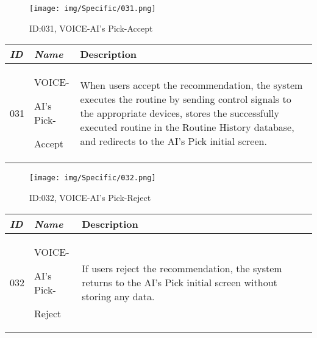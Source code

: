 \documentclass[conference]{IEEEtran}
\begin{document}
\begin{enumerate}[label=\arabic*]
    \begin{figure}[h]
        \centering
        \texttt{[image: img/Specific/031.png]}
        \caption{ID:031, VOICE-AI's Pick-Accept}
    \end{figure}

    \begin{table}[h]
    \def\arraystretch{1.2} \small
        \begin{tabular}{|p{1cm}|p{1.8cm}|p{4.8cm}|}
        \hline
            \textit{\textbf{ID}} & \textit{\textbf{Name}} & {\textbf{Description}} \\
        \hline
            031 \par & VOICE-\par AI's Pick-\par Accept & When users accept the recommendation, the system executes the routine by sending control signals to the appropriate devices, stores the successfully executed routine in the Routine History database, and redirects to the AI's Pick initial screen. \\
        \hline
        \end{tabular}
    \end{table}

    \newpage

    \begin{figure}[h]
        \centering
        \texttt{[image: img/Specific/032.png]}
        \caption{ID:032, VOICE-AI's Pick-Reject}
    \end{figure}

    \begin{table}[h]
    \def\arraystretch{1.2} \small
        \begin{tabular}{|p{1cm}|p{1.8cm}|p{4.8cm}|}
        \hline
            \textit{\textbf{ID}} & \textit{\textbf{Name}} & {\textbf{Description}} \\
        \hline
            032 \par & VOICE-\par AI's Pick-\par Reject & If users reject the recommendation, the system returns to the AI's Pick initial screen without storing any data. \\
        \hline
        \end{tabular}
    \end{table}

    \vspace{2em}


\end{enumerate}
\end{document}
